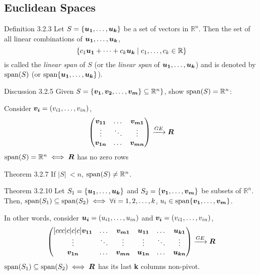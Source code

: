 \documentclass[11pt,landscape]{article}
\begin{document}
\begin{multicols}{2}
\begin{justifying}
\section{Euclidean Spaces}

\begin{namedthm*}{Definition 3.2.3}
    Let \(S = \{\bm{u_1}, \dots, \bm{u_k}\}\) be a set of vectors in \(\mathbb{R}^n\). Then the set of all linear combinations of \(\bm{u_1}, \dots, \bm{u_k}\),
    \[
        \{c_1\bm{u_1} + \cdots + c_k\bm{u_k} \mid c_1, \dots, c_k \in \mathbb{R}\}
    \]
    is called the \textit{linear span} of \(S\) (or the \textit{linear span} of \(\bm{u_1}, \dots, \bm{u_k}\)) and is denoted by \(\operatorname{span}(S)\) (or \(\operatorname{span} \{\bm{u_1}, \dots, \bm{u_k} \}\)).
\end{namedthm*}

\begin{namedthm*}{Discussion 3.2.5}
	Given \(S = \{\bm{v_1}, \bm{v_2}, \dots, \bm{v_m}\} \subseteq \mathbb{R}^n\}\), show \(\operatorname{span}(S) = \mathbb{R}^n\):
	
	\medskip
	\noindent
	Consider \(\bm{v_i} = \left(v_{i1}, \dots, v_{in}\right)\),
	\[
	\begin{pmatrix}
	\bm{v_{11}} & \dots & \bm{v_{m1}}\\
	\vdots & \ddots & \vdots\\
	\bm{v_{1n}} & \dots & \bm{v_{mn}}
	\end{pmatrix} \xrightarrow{GE} \bm{R}
	\]
	\(\operatorname{span}(S) = \mathbb{R}^n \iff \bm{R}\) has no zero rows
\end{namedthm*}

\begin{namedthm*}{Theorem 3.2.7}
	If \(\lvert S \rvert\ < n\), \(\operatorname{span}(S) \ne \mathbb{R}^n\).
\end{namedthm*}

\begin{namedthm*}{Theorem 3.2.10}
	Let \(S_1 = \{\bm{u_1}, \dots, \bm{u_k}\}\) and \(S_2 = \{\bm{v_1}, \dots, \bm{v_m}\}\) be subsets of \(\mathbb{R}^n\). Then, \(\operatorname{span}(S_1) \subseteq \operatorname{span}(S_2) \iff \forall i=1, 2, \dots, k\), \(u_i \in \operatorname{span}\{\bm{v_1}, \dots, \bm{v_m}\}\).
	
	\medskip
	\noindent
	In other words, consider \(\bm{u_i} = \left(u_{i1}, \dots, u_{in}\right)\) and \(\bm{v_i} = \left(v_{i1}, \dots, v_{in}\right)\), \\
	\[
	\begin{pmatrix}[ccc|c|c|c]
	\bm{v_{11}} & \dots & \bm{v_{m1}} & \bm{u_{11}} & \dots & \bm{u_{k1}}\\
	\vdots & \ddots & \vdots & \vdots & \ddots & \vdots \\
	\bm{v_{1n}} & \dots & \bm{v_{mn}} & \bm{u_{1n}} & \dots & \bm{u_{kn}}
	\end{pmatrix} \xrightarrow{GE} \bm{R}
	\]
	\(\operatorname{span}(S_1) \subseteq \operatorname{span}(S_2) \iff \bm{R}\) has its last \textbf{k} columns non-pivot.
\end{namedthm*}


\end{justifying}
\end{multicols}
\end{document}
